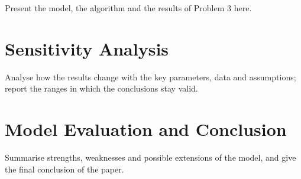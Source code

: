 Present the model, the algorithm and the results of Problem 3 here.

\section{Sensitivity Analysis}

Analyse how the results change with the key parameters, data and
assumptions; report the ranges in which the conclusions stay valid.

\section{Model Evaluation and Conclusion}

Summarise strengths, weaknesses and possible extensions of the model, and
give the final conclusion of the paper.
